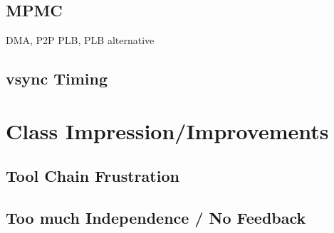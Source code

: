 \documentclass[letterpaper,10pt]{article}
\begin{document}
\subsection{MPMC}
DMA, P2P PLB, PLB alternative

\subsection{vsync Timing}

\section{Class Impression/Improvements}

\subsection{Tool Chain Frustration}
\subsection{Too much Independence / No Feedback}
\end{document}
